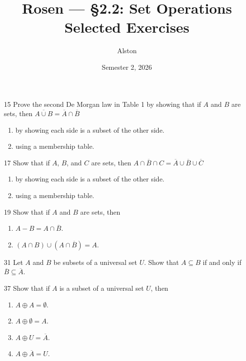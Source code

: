 \documentclass[11pt]{article}
\title{Rosen --- \S 2.2: Set Operations\\ \large Selected Exercises}
\author{Alston}
\date{Semester 2, 2026}
\begin{document}
\maketitle

\begin{exercise}{15}
    Prove the second De Morgan law in Table 1 by showing that if $A$ and
    $B$ are sets, then $\overline{A \cup B} = \overline{A} \cap
    \overline{B}$
    \begin{enumerate}[label=(\alph*)]
        \item by showing each side is a subset of the other side.
        \item using a membership table.
    \end{enumerate}
\end{exercise}

\begin{exercise}{17}
    Show that if $A$, $B$, and $C$ are sets, then
    $\overline{A \cap B \cap C} = \overline{A} \cup \overline{B} \cup
    \overline{C}$
    \begin{enumerate}[label=(\alph*)]
        \item by showing each side is a subset of the other side.
        \item using a membership table.
    \end{enumerate}
\end{exercise}

\begin{exercise}{19}
    Show that if $A$ and $B$ are sets, then
    \begin{enumerate}[label=(\alph*)]
        \item $A - B = A \cap \overline{B}$.
        \item $(A \cap B) \cup (A \cap \overline{B}) = A$.
    \end{enumerate}
\end{exercise}

\begin{exercise}{31}
    Let $A$ and $B$ be subsets of a universal set $U$. Show that
    $A \subseteq B$ if and only if $\overline{B} \subseteq \overline{A}$.
\end{exercise}

\begin{exercise}{37}
    Show that if $A$ is a subset of a universal set $U$, then
    \begin{enumerate}[label=(\alph*)]
        \item $A \oplus A = \emptyset$.
        \item $A \oplus \emptyset = A$.
        \item $A \oplus U = \overline{A}$.
        \item $A \oplus \overline{A} = U$.
    \end{enumerate}
\end{exercise}
\end{document}
